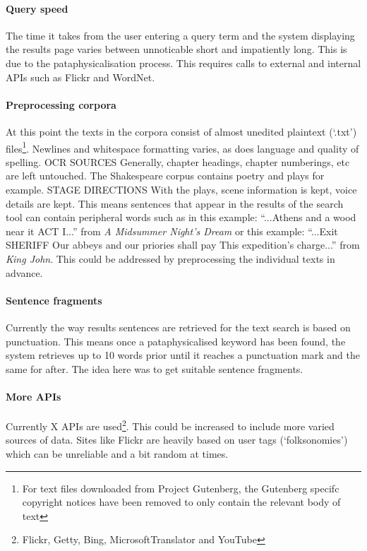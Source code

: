 \paragraph{Query speed} 
The time it takes from the user entering a query term and the system displaying the results page varies between unnoticable short and impatiently long. This is due to the pataphysicalisation process. This requires calls to external and internal \ac{API}s such as Flickr and WordNet.

\paragraph{Preprocessing corpora} 
At this point the texts in the corpora consist of almost unedited plaintext (`.txt') files\footnote{For text files downloaded from Project Gutenberg, the Gutenberg specifc copyright notices have been removed to only contain the relevant body of text}. Newlines and whitespace formatting varies, as does language and quality of spelling. OCR SOURCES Generally, chapter headings, chapter numberings, etc are left untouched. The Shakespeare corpus contains poetry and plays for example. STAGE DIRECTIONS With the plays, scene information is kept, voice details are kept. This means sentences that appear in the results of the search tool can contain peripheral words such as in this example: ``...Athens and a wood near it ACT I...'' from \textit{A Midsummer Night's Dream} or this example: ``...Exit SHERIFF Our abbeys and our priories shall pay This expedition's charge...'' from \textit{King John}. This could be addressed by preprocessing the individual texts in advance.

\paragraph{Sentence fragments} 
Currently the way results sentences are retrieved for the text search is based on punctuation. This means once a pataphysicalised keyword has been found, the system retrieves up to \num{10} words prior until it reaches a punctuation mark and the same for after. The idea here was to get suitable sentence fragments.

\paragraph{More APIs} 
Currently X \ac{API}s are used\footnote{Flickr, Getty, Bing, MicrosoftTranslator and YouTube}. This could be increased to include more varied sources of data. Sites like Flickr are heavily based on user tags (`folksonomies') which can be unreliable and a bit random at times.

